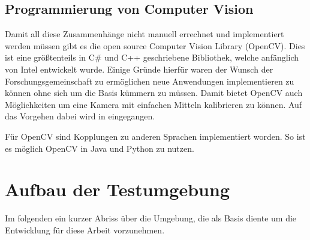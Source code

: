 \subsection{Programmierung von Computer Vision}
Damit all diese Zusammenhänge nicht manuell errechnet und implementiert werden müssen gibt es die open source Computer Vision Library (OpenCV). Dies ist eine größtenteils in C\# und C++  geschriebene Bibliothek, welche anfänglich von Intel entwickelt wurde. \textbf{\autocite[512--]{Medioni:2004:ETC:993884} }Einige Gründe hierfür waren der Wunsch der Forschungsgemeinschaft zu ermöglichen neue Anwendungen implementieren zu können ohne sich um die Basis kümmern zu müssen. Damit bietet OpenCV auch Möglichkeiten um eine Kamera mit einfachen Mitteln kalibrieren zu können. Auf das Vorgehen dabei wird in  eingegangen.

Für OpenCV sind Kopplungen zu anderen Sprachen implementiert worden. So ist es möglich OpenCV in Java und Python zu nutzen. 


\section{Aufbau der Testumgebung}
\label{sec:setup}
Im folgenden ein kurzer Abriss über die Umgebung, die als Basis diente um die Entwicklung für diese Arbeit vorzunehmen. 



